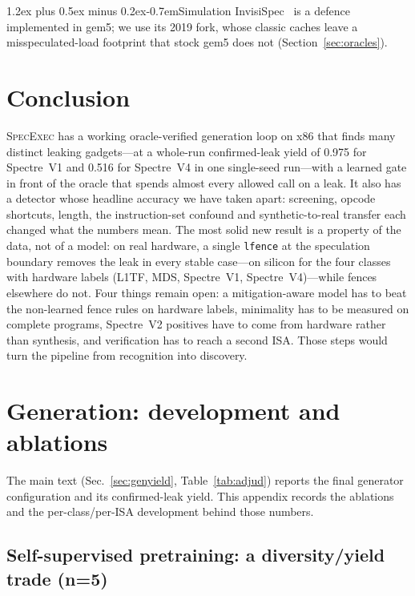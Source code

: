 \documentclass[conference]{IEEEtran}
\makeatletter
\renewcommand\paragraph{\@startsection{paragraph}{4}{\z@}%
  {1.2ex plus 0.5ex minus 0.2ex}{-0.7em}{\normalfont\normalsize\bfseries}}
\makeatother
\begin{document}
\paragraph{Simulation} InvisiSpec~\cite{invisispec} is a defence implemented
in gem5; we use its 2019 fork, whose classic caches leave a misspeculated-load
footprint that stock gem5 does not (Section~\ref{sec:oracles}).


\section{Conclusion}
\label{sec:conclusion}
\textsc{SpecExec} has a working oracle-verified generation loop on x86 that
finds many distinct leaking gadgets---at a whole-run confirmed-leak yield of
0.975 for Spectre~V1 and 0.516 for Spectre~V4 in one single-seed run---with a learned gate in front of the
oracle that spends almost every allowed call on a leak. It also has a detector
whose headline accuracy we have taken apart: screening, opcode shortcuts,
length, the instruction-set confound and synthetic-to-real transfer each
changed what the numbers mean. The most solid new result is a property of the
data, not of a model: on real hardware, a single \texttt{lfence} at the
speculation boundary removes the leak in every stable case---on silicon for the
four classes with hardware labels (L1TF, MDS, Spectre~V1,
Spectre~V4)---while fences elsewhere do not. Four things remain open: a
mitigation-aware model has to beat the non-learned fence rules on hardware
labels, minimality has to be measured on complete programs, Spectre~V2
positives have to come from hardware rather than synthesis, and verification
has to reach a second ISA. Those steps would turn the pipeline from recognition
into discovery.

\appendices

\section{Generation: development and ablations}
\label{app:gendev}
The main text (Sec.~\ref{sec:genyield}, Table~\ref{tab:adjud}) reports the final
generator configuration and its confirmed-leak yield. This appendix records the
ablations and the per-class/per-ISA development behind those numbers.

\subsection{Self-supervised pretraining: a diversity/yield trade (n=5)}
\end{document}
